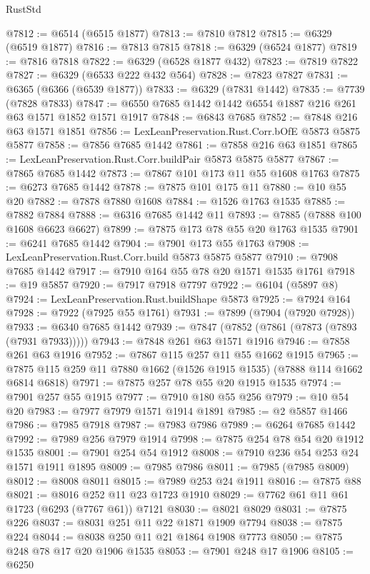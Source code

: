 \begin{lexlean}{RustStd}
\begin{coremodule}
{{@7812 := @6514 (@6515 @1877)
@7813 := @7810 @7812
@7815 := @6329 (@6519 @1877)
@7816 := @7813 @7815
@7818 := @6329 (@6524 @1877)
@7819 := @7816 @7818
@7822 := @6329 (@6528 @1877 @432)
@7823 := @7819 @7822
@7827 := @6329 (@6533 @222 @432 @564)
@7828 := @7823 @7827
@7831 := @6365 (@6366 (@6539 @1877))
@7833 := @6329 (@7831 @1442)
@7835 := @7739 (@7828 @7833)
@7847 := @6550 @7685 @1442 @1442 @6554 @1887 @216 @261 @63 @1571 @1852 @1571 @1917
@7848 := @6843 @7685
@7852 := @7848 @216 @63 @1571 @1851
@7856 := LexLeanPreservation.Rust.Corr.bOfE @5873 @5875 @5877
@7858 := @7856 @7685 @1442
@7861 := @7858 @216 @63 @1851
@7865 := LexLeanPreservation.Rust.Corr.buildPair @5873 @5875 @5877
@7867 := @7865 @7685 @1442
@7873 := @7867 @101 @173 @11 @55 @1608 @1763
@7875 := @6273 @7685 @1442
@7878 := @7875 @101 @175 @11
@7880 := @10 @55 @20
@7882 := @7878 @7880 @1608
@7884 := @1526 @1763 @1535
@7885 := @7882 @7884
@7888 := @6316 @7685 @1442 @11
@7893 := @7885 (@7888 @100 @1608 @6623 @6627)
@7899 := @7875 @173 @78 @55 @20 @1763 @1535
@7901 := @6241 @7685 @1442
@7904 := @7901 @173 @55 @1763
@7908 := LexLeanPreservation.Rust.Corr.build @5873 @5875 @5877
@7910 := @7908 @7685 @1442
@7917 := @7910 @164 @55 @78 @20 @1571 @1535 @1761
@7918 := @19 @5857
@7920 := @7917 @7918 @7797
@7922 := @6104 (@5897 @8)
@7924 := LexLeanPreservation.Rust.buildShape @5873
@7925 := @7924 @164
@7928 := @7922 (@7925 @55 @1761)
@7931 := @7899 (@7904 (@7920 @7928))
@7933 := @6340 @7685 @1442
@7939 := @7847 (@7852 (@7861 (@7873 (@7893 (@7931 @7933)))))
@7943 := @7848 @261 @63 @1571 @1916
@7946 := @7858 @261 @63 @1916
@7952 := @7867 @115 @257 @11 @55 @1662 @1915
@7965 := @7875 @115 @259 @11 @7880 @1662 (@1526 @1915 @1535) (@7888 @114 @1662 @6814 @6818)
@7971 := @7875 @257 @78 @55 @20 @1915 @1535
@7974 := @7901 @257 @55 @1915
@7977 := @7910 @180 @55 @256
@7979 := @10 @54 @20
@7983 := @7977 @7979 @1571 @1914 @1891
@7985 := @2 @5857 @1466
@7986 := @7985 @7918
@7987 := @7983 @7986
@7989 := @6264 @7685 @1442
@7992 := @7989 @256 @7979 @1914
@7998 := @7875 @254 @78 @54 @20 @1912 @1535
@8001 := @7901 @254 @54 @1912
@8008 := @7910 @236 @54 @253 @24 @1571 @1911 @1895
@8009 := @7985 @7986
@8011 := @7985 (@7985 @8009)
@8012 := @8008 @8011
@8015 := @7989 @253 @24 @1911
@8016 := @7875 @88
@8021 := @8016 @252 @11 @23 @1723 @1910
@8029 := @7762 @61 @11 @61 @1723 (@6293 (@7767 @61)) @7121
@8030 := @8021 @8029
@8031 := @7875 @226
@8037 := @8031 @251 @11 @22 @1871 @1909 @7794
@8038 := @7875 @224
@8044 := @8038 @250 @11 @21 @1864 @1908 @7773
@8050 := @7875 @248 @78 @17 @20 @1906 @1535
@8053 := @7901 @248 @17 @1906
@8105 := @6250
}}
\end{coremodule}
\end{lexlean}
